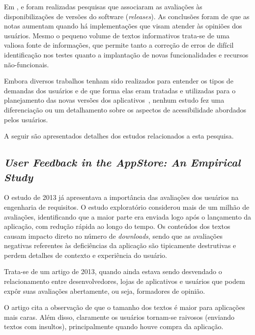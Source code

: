 Em \cite{Palomba2015userreviews}, \cite{Palomba2018crowdsourcing} e \cite{Li2018MobileAE} foram realizadas pesquisas que associaram as avaliações às disponibilizações de versões do software (\textit{releases}). As conclusões foram de que as notas aumentam quando há implementações que visam atender às opiniões dos usuários. Mesmo o pequeno volume de textos informativos trata-se de uma valiosa fonte de informações, que permite tanto a correção de erros de difícil identificação nos testes quanto a implantação de novas funcionalidades e recursos não-funcionais.

Embora diversos trabalhos tenham sido realizados para entender os tipos de demandas dos usuários e de que forma elas eram tratadas e utilizadas para o planejamento das novas versões dos aplicativos~\cite{Iacob2013retrieving,Pagano2013userfeedback,Iacob2014online,Mcilroy2016analyzing,Sorbo2017surf,Ciurumelea2017analyzing,Li2018MobileAE,Pelloni2018becloma,Panichella2015how}, nenhum estudo fez uma diferenciação ou um detalhamento sobre os aspectos de acessibilidade abordados pelos usuários. 



A seguir são apresentados detalhes dos estudos relacionados a esta pesquisa.

\subsection{\textit{User Feedback in the AppStore: An Empirical Study}}
O estudo \cite{Pagano2013userfeedback} de 2013 já apresentava a importância das avaliações dos usuários na engenharia de requisitos. O estudo exploratório considerou mais de um milhão de avaliações, identificando que a maior parte era enviada logo após o lançamento da aplicação, com redução rápida ao longo do tempo. Os conteúdos dos textos causam impacto direto no número de \textit{downloads}, sendo que as avaliações negativas referentes às deficiências da aplicação são tipicamente destrutivas e perdem detalhes de contexto e experiência do usuário.

Trata-se de um artigo de 2013, quando ainda estava sendo desvendado o relacionamento entre desenvolvedores, lojas de aplicativos e usuários que podem expôr suas avaliações abertamente, ou seja, formadores de opinião.

O artigo cita a observação de que o tamanho dos textos é maior para aplicações mais caras. Além disso, claramente os usuários tornam-se raivosos (enviando textos com insultos), principalmente quando houve compra da aplicação.

